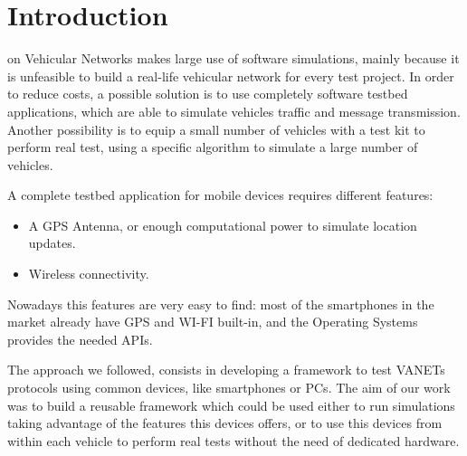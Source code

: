 \section{Introduction}
% 
% 
% 
% 
 on Vehicular Networks makes large use of software simulations, mainly because it is unfeasible to build a real-life vehicular network for every test project. 
In order to reduce costs, a possible solution is to use completely software testbed applications, which are able to simulate vehicles traffic and message transmission\cite{gradinescu}.
Another possibility is to equip a small number of vehicles with a test kit to perform real test, using a specific algorithm to simulate a large number of vehicles\cite{rocetti}.


A complete testbed application for mobile devices requires different features:
\begin{itemize}
	\item A GPS Antenna, or enough computational power to simulate location updates.
	\item Wireless connectivity.
\end{itemize}

Nowadays this features are very easy to find: most of the smartphones in the market already have GPS and WI-FI built-in, and the Operating Systems provides the needed APIs.

The approach we followed, consists in developing a framework to test VANETs protocols using common devices, like smartphones or PCs. 
The aim of our work was to build a reusable framework which could be used either to run simulations taking advantage of the features this devices offers, or to use this devices from within each vehicle to perform real tests without the need of dedicated hardware.

